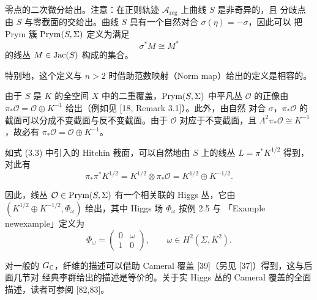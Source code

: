 零点的二次微分给出。注意：在正则轨迹 $\mathcal{A}_{\mathrm{reg}}$ 上曲线 $S$ 是非奇异的，且
分歧点由 $S$ 与零截面的交给出。曲线 $S$ 具有一个自然对合 $\sigma(\eta)=-\sigma$，因此可以
把 Prym 簇 $\operatorname{Prym}(S,\Sigma)$ 定义为满足
\[
\sigma^*M\cong M^*
\]
的线丛 $M\in\operatorname{Jac}(S)$ 构成的集合。

特别地，这个定义与 $n>2$ 时借助范数映射（Norm map）给出的定义是相容的。

由于 $S$ 是 $K$ 的全空间 $X$ 中的二重覆盖，$\operatorname{Prym}(S,\Sigma)$ 中平凡丛 $\mathcal{O}$ 的正像由
$\pi_*\mathcal{O}=\mathcal{O}\oplus K^{-1}$ 给出（例如见 [18, Remark 3.1]）。此外，由自然
对合 $\sigma$，$\pi_*\mathcal{O}$ 的截面可以分成不变截面与反不变截面。由于 $\mathcal{O}$
对应于不变截面，且 $\Lambda^2\pi_*\mathcal{O}\cong K^{-1}$，故必有
$\pi_*\mathcal{O}=\mathcal{O}\oplus K^{-1}$。

如式 (3.3) 中引入的 Hitchin 截面，可以自然地由 $S$ 上的线丛 $L=\pi^*K^{1/2}$ 得到，对此有
\[
\pi_*\pi^*K^{1/2}=K^{1/2}\otimes\pi_*\mathcal{O}=K^{1/2}\oplus K^{-1/2}.
\]

因此，线丛 $\mathcal{O}\in\operatorname{Prym}(S,\Sigma)$ 有一个相关联的 Higgs 丛，它由
$(K^{1/2}\oplus K^{-1/2},\Phi_\omega)$ 给出，其中 Higgs 场 $\Phi_\omega$ 按例 2.5 与
「Example newexample」定义为
\[
\Phi_\omega=\begin{pmatrix} 0 & \omega\\ 1 & 0\end{pmatrix},
\qquad \omega\in H^2(\Sigma,K^2).
\]

对一般的 $G_{\mathbb{C}}$，纤维的描述可以借助 Cameral 覆盖 [39]（另见 [37]）得到，这与后面几节对
经典李群给出的描述是等价的。关于实 Higgs 丛的 Cameral 覆盖的全面描述，读者可参阅 [82,83]。

